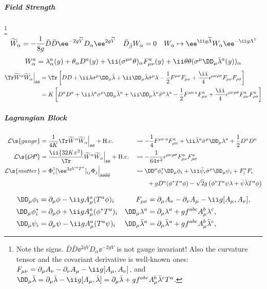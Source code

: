 \subparagraph{Field Strength}%
\footnote{Note the signs. $\bar D\bar D\ee^{2gV}D_\alpha\ee^{-2gV}$ is not gauge invariant!
Also the curvature tensor and the covariant derivative is well-known ones:
$F_{\mu\nu}= \Pm A_\nu-\Pn A_\mu-\ii g[A_\mu,A_\nu]$, and
$\Dm\bar\lambda
  =\Pm\bar\lambda-\ii g[A_\mu,\bar\lambda]
  =\Pm\bar\lambda+gf^{abc}A^b_\mu\bar\lambda^cT^a$.
}
\begin{align}
\tilde W_\alpha
&= -\frac1{8g}\bar D\bar D\ee^{-2g\tilde V}D_\alpha\ee^{2g\tilde V}
& \bar D_\dbeta W_\alpha &= 0 & W_\alpha\mapsto \ee^{\ii g\tilde \Lambda}W_\alpha\ee^{-\ii g\Lambda^\dagger}
\end{align}\vspace{-10pt}
\begin{equation}
 W_\alpha^a= \lambda^a_\alpha(y)
 + \theta_\alpha D^a(y)+\ii(\Smn\theta)_\alpha F^a_{\mu\nu}(y)
+\ii\thth(\Sm\Dm\bar\lambda^a(y))_\alpha
\end{equation}\vspace{-24pt}
\begin{align}
 \Tr\tilde W^\alpha\tilde W_\alpha\Big|_\thth
&=\Tr\left[
DD+\ii\lambda\Sm\Dm\bar\lambda+\ii\Dm\bar\lambda\bSm\lambda
-\frac12F^{\mu\nu}F_{\mu\nu}+\frac\ii4\epsilon^{\mu\nu\rho\sigma}F_{\mu\nu}F_{\rho\sigma}
\right]\\
&=K\left[
D^aD^a+\ii\lambda^a\Sm\Dm\bar\lambda^a+\ii\Dm\bar\lambda^a\bSm\lambda^a
-\frac12F^{\mu\nu\,a}F_{\mu\nu}^a+\frac\ii4\epsilon^{\mu\nu\rho\sigma}F_{\mu\nu}^aF_{\rho\sigma}^a
\right]
\end{align}

\subparagraph{Lagrangian Block}
\begin{align}
 \Lag\s{gauge}&= \frac1{4K}\Tr\tilde W^\alpha\tilde W_\alpha\Big|_\thth + \Hc
&&\leadsto
-\frac14F^{\mu\nu\,a}F_{\mu\nu}^a + \ii\bar\lambda^a\bSm\Dm\lambda^a + \frac12D^aD^a
\\\Lag\s{\cancel{CP}} &= \frac\ii{32K\pi^2}\Tr\tilde W^\alpha\tilde W_\alpha\Big|_\thth + \Hc
&&\leadsto-\frac1{64\pi^2}\epsilon^{\mu\nu\rho\sigma}F_{\mu\nu}^aF_{\rho\sigma}^a
\\\Lag\s{matter}&=\Phi^\dagger_i[\ee^{2gV^aT^a}]_{ij}\Phi_j\Big|_{\thth\bthth}
&&\leadsto
 \Dmu\phi_i^*\Dm\phi_i+\ii\bar\psi_i\bSm\Dm\psi_i+F^*_iF_i
\notag\\&&&\qquad+ gD^a(\phi^*T^a\phi)-\sqrt2g\left(\phi^*T^a\psi\lambda+\bar\psi\bar\lambda T^a\phi\right)
\end{align}

\begin{align*}
 \Dm\phi_i &=\Pm\phi-\ii gA_\mu^a(T^a\phi)_i&
 F_{\mu\nu}&= \Pm A_\nu-\Pn A_\mu-\ii g[A_\mu,A_\nu],\\
 \Dm\phi^*_i&=\Pm\phi+\ii gA_\mu^a(\phi^*T^a)_i&
 \Dm\lambda^a&=\Pm\lambda^a+gf^{abc}A^b_\mu\lambda^c,\\
 \Dm\psi_i &=\Pm\psi-\ii gA_\mu^a(T^a\psi)_i&
 \Dm\bar\lambda^a&=\Pm\bar\lambda^a+gf^{abc}A^b_\mu\bar\lambda^c,\\
\end{align*}



